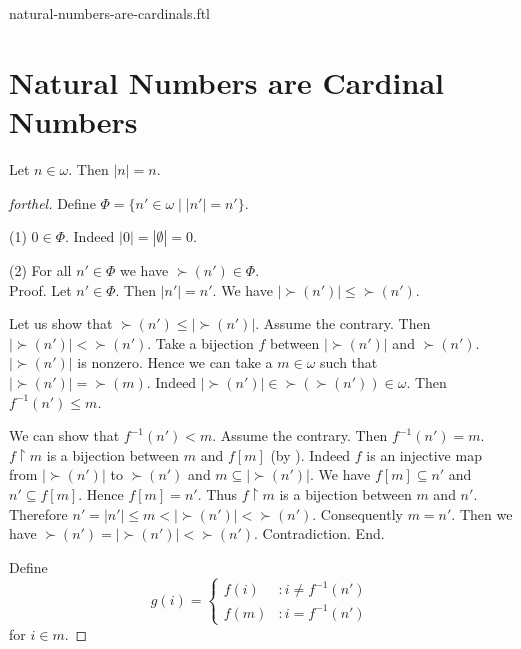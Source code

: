 \documentclass{naproche-library}
\begin{document}
\begin{smodule}{natural-numbers-are-cardinals.ftl}

  \section*{Natural Numbers are Cardinal Numbers}

  \begin{theorem}[forthel,id=SET_THEORY_07_2948332552978432]
    Let $n \in \omega$.
    Then $|n| = n$.
  \end{theorem}
  \begin{proof}[forthel]
    Define $\Phi = \{ n' \in \omega \mid |n'| = n' \}$.

    (1) $0 \in \Phi$.
    Indeed $|0| = |\emptyset| = 0$.

    (2) For all $n' \in \Phi$ we have $\succ(n') \in \Phi$. \\
    Proof.
      Let $n' \in \Phi$.
      Then $|n'| = n'$.
      We have $|\succ(n')| \leq \succ(n')$.

      Let us show that $\succ(n') \leq |\succ(n')|$.
        Assume the contrary.
        Then $|\succ(n')| < \succ(n')$.
        Take a bijection $f$ between $|\succ(n')|$ and $\succ(n')$.
        $|\succ(n')|$ is nonzero.
        Hence we can take a $m \in \omega$ such that $|\succ(n')| = \succ(m)$.
        Indeed $|\succ(n')| \in \succ(\succ(n')) \in \omega$.
        Then $f^{-1}(n') \leq m$.

        We can show that $f^{-1}(n') < m$.
          Assume the contrary.
          Then $f^{-1}(n') = m$.
          $f \restriction m$ is a bijection between $m$ and $f[m]$ (by ).
          Indeed $f$ is an injective map from $|\succ(n')|$ to $\succ(n')$ and
          $m \subseteq |\succ(n')|$.
          We have $f[m] \subseteq n'$ and $n' \subseteq f[m]$.
          Hence $f[m] = n'$.
          Thus $f \restriction m$ is a bijection between $m$ and $n'$.
          Therefore $n'
            = |n'|
            \leq m
            < |\succ(n')|
            < \succ(n')$.
          Consequently $m = n'$.
          Then we have $\succ(n') = |\succ(n')| < \succ(n')$.
          Contradiction.
        End.

        Define \[ g(i) =
          \begin{cases}
            f(i)  & : i \neq f^{-1}(n')
            \\
            f(m)  & : i = f^{-1}(n')
          \end{cases} \]
        for $i \in m$.


\end{proof}
\end{smodule}
\end{document}
